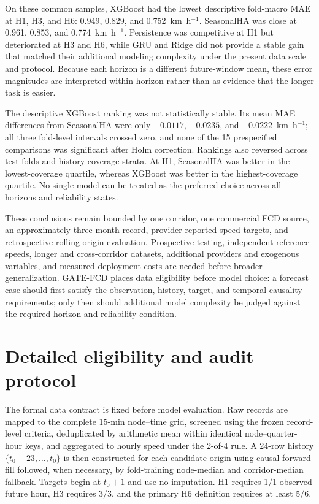 \documentclass[pdflatex,sn-basic,Numbered]{sn-jnl}
\begin{document}
On these common samples, XGBoost had the lowest descriptive fold-macro MAE at H1, H3, and H6: 0.949, 0.829, and 0.752~km~h$^{-1}$. SeasonalHA was close at 0.961, 0.853, and 0.774~km~h$^{-1}$. Persistence was competitive at H1 but deteriorated at H3 and H6, while GRU and Ridge did not provide a stable gain that matched their additional modeling complexity under the present data scale and protocol. Because each horizon is a different future-window mean, these error magnitudes are interpreted within horizon rather than as evidence that the longer task is easier.

The descriptive XGBoost ranking was not statistically stable. Its mean MAE differences from SeasonalHA were only $-0.0117$, $-0.0235$, and $-0.0222$~km~h$^{-1}$; all three fold-level intervals crossed zero, and none of the 15 prespecified comparisons was significant after Holm correction. Rankings also reversed across test folds and history-coverage strata. At H1, SeasonalHA was better in the lowest-coverage quartile, whereas XGBoost was better in the highest-coverage quartile. No single model can be treated as the preferred choice across all horizons and reliability states.

These conclusions remain bounded by one corridor, one commercial FCD source, an approximately three-month record, provider-reported speed targets, and retrospective rolling-origin evaluation. Prospective testing, independent reference speeds, longer and cross-corridor datasets, additional providers and exogenous variables, and measured deployment costs are needed before broader generalization. GATE-FCD places data eligibility before model choice: a forecast case should first satisfy the observation, history, target, and temporal-causality requirements; only then should additional model complexity be judged against the required horizon and reliability condition.

\appendix

\section{Detailed eligibility and audit protocol}
\label{app:audit}

The formal data contract is fixed before model evaluation. Raw records are mapped to the complete 15-min node--time grid, screened using the frozen record-level criteria, deduplicated by arithmetic mean within identical node--quarter-hour keys, and aggregated to hourly speed under the 2-of-4 rule. A 24-row history $\{t_0-23,\ldots,t_0\}$ is then constructed for each candidate origin using causal forward fill followed, when necessary, by fold-training node-median and corridor-median fallback. Targets begin at $t_0+1$ and use no imputation. H1 requires 1/1 observed future hour, H3 requires 3/3, and the primary H6 definition requires at least 5/6.
\end{document}
